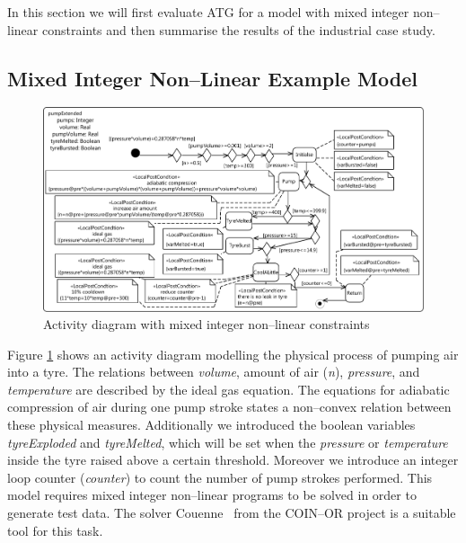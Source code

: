 \documentclass[runningheads,a4paper]{llncs}%
\newcommand{\OCLVar}[1]{\textit{#1}}
\begin{document}
In this section we will first evaluate ATG for a model with mixed integer
non--linear constraints and then summarise the results of the industrial case
study.%
\subsection{Mixed Integer Non--Linear Example Model}
\label{sec:exampleModelNonConvex}
\begin{figure}
\includegraphics[width=\textwidth]{../Thesis/pics/pumpTyre.pdf}
\caption{Activity diagram with mixed integer non--linear constraints}
\label{fig:pumpTyre}
\end{figure}
Figure \ref{fig:pumpTyre} shows an activity diagram modelling the physical
process of pumping air into a tyre. The relations between \OCLVar{volume},
amount of air (\OCLVar{n}), \OCLVar{pressure}, and \OCLVar{temperature} are
described by the ideal gas equation. The equations for adiabatic compression of
air during one pump stroke states a non--convex relation between these physical
measures. Additionally we introduced the boolean variables \OCLVar{tyreExploded}
and \OCLVar{tyreMelted}, which will be set when the \OCLVar{pressure} or
\OCLVar{temperature} inside the tyre raised above a certain threshold. Moreover
we introduce an integer loop counter (\OCLVar{counter}) to count the number of
pump strokes performed. This model requires mixed integer non--linear programs
to be solved in order to generate test data. The solver
Couenne~\cite{Belotti09couenne} from the COIN--OR project is a suitable tool for
this task.%
\end{document}

